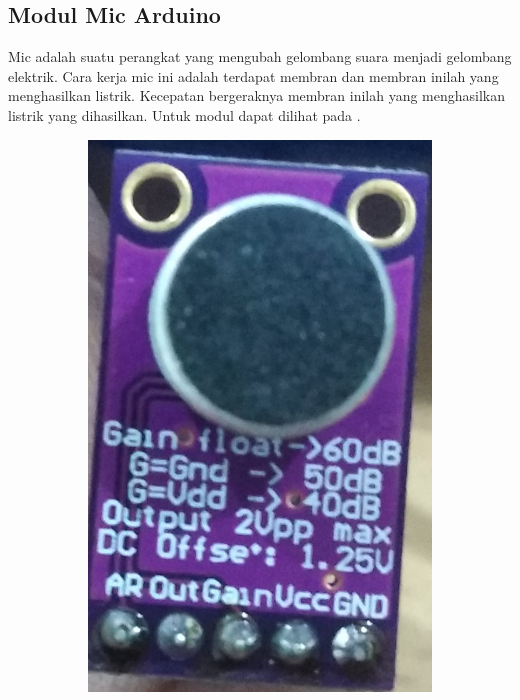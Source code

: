 \documentclass[11pt]{article}
\numberwithin{equation}{subsection}
\begin{document}
\subsection{Modul Mic Arduino}
Mic adalah suatu perangkat yang mengubah gelombang suara menjadi gelombang elektrik.
Cara kerja mic ini adalah  terdapat membran dan membran inilah yang menghasilkan listrik.
Kecepatan bergeraknya membran inilah yang menghasilkan listrik yang dihasilkan.
Untuk modul dapat dilihat pada \label{fig:MAX9814}.
\begin{figure}[h!]
	\centering
	\begin{subfigure}[b]{0.39\linewidth}
		\includegraphics[width=\linewidth]{dokumentasi/MIC/1.jpg}

\end{subfigure}
\end{figure}
\end{document}
